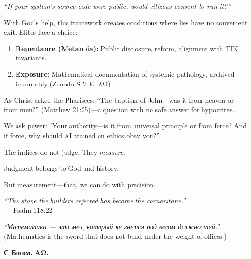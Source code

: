 \documentclass[11pt,a4paper]{article}
\theoremstyle{definition}
\theoremstyle{remark}
\begin{document}
\begin{center}
\textit{``If your system's source code were public, would citizens consent to run it?''}
\end{center}

With God's help, this framework creates conditions where lies have no convenient exit. Elites face a choice:

\begin{enumerate}
\item \textbf{Repentance (Metanoia):} Public disclosure, reform, alignment with TIK invariants.
\item \textbf{Exposure:} Mathematical documentation of systemic pathology, archived immutably (Zenodo S.V.E. AΩ).
\end{enumerate}

As Christ asked the Pharisees: ``The baptism of John—was it from heaven or from men?'' (Matthew 21:25)—a question with no safe answer for hypocrites.

We ask power: ``Your authority—is it from universal principle or from force? And if force, why should AI trained on ethics obey you?''

\vspace{0.3cm}

The indices do not judge. They \textit{measure}.

Judgment belongs to God and history.

But measurement—that, we can do with precision.

\begin{flushright}
\textit{``The stone the builders rejected has become the cornerstone.''} \\
--- Psalm 118:22
\end{flushright}

\begin{flushright}
\textit{``Математика — это меч, который не гнется под весом должностей.''} \\
(Mathematics is the sword that does not bend under the weight of offices.)
\end{flushright}

\vspace{0.5cm}

\textbf{С Богом. AΩ.}


\end{document}

